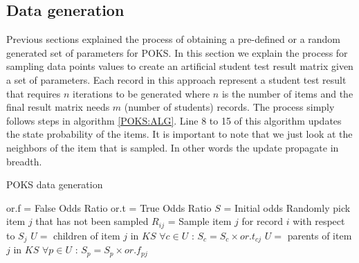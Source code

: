 \subsection{Data generation}


Previous sections explained the process of obtaining a pre-defined or a random generated set of parameters for POKS. In this section we explain the process for sampling data points values to create an artificial student test result matrix given a set of parameters. Each record in this approach represent a student test result that requires $n$ iterations to be generated where $n$ is the number of items and the final result matrix needs $m$ (number of students) records. The process simply follows steps in algorithm \ref{POKS:ALG}. Line 8 to 15 of this algorithm updates the state probability of the items. It is important to note that we just look at the neighbors of the item that is sampled. In other words the update propagate in breadth.


\begin{algorithm}
\caption{POKS data generation}
\label{CHalgorithm}
\begin{algorithmic}[1]
\State or.f = False Odds Ratio
\State or.t = True Odds Ratio
\State  $S$ = Initial odds
\State Randomly pick item $j$ that has not been sampled
\State $R_{ij}$ =  Sample item $j$ for record $i$ with respect to $S_j$
\State $U =$ children of item $j$ in $KS$
\State  $\forall c\in U$ :  $S_c = S_c\times or.t_{cj}$
\EndIf
{}
\State $U =$ parents of item $j$ in $KS$
\State  $\forall p\in U$ :  $S_p = S_p\times or.f_{pj}$
\EndIf
\EndFor
\EndFor
\end{algorithmic}
\label{POKS:ALG}
\end{algorithm}

